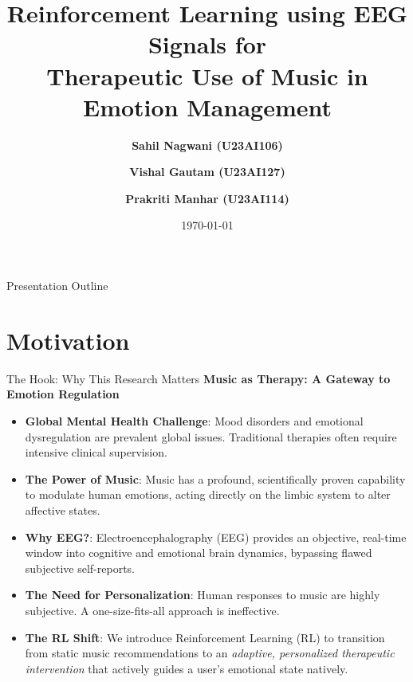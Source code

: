 \documentclass[10pt, aspectratio=169]{beamer}
\title[RL for Music Emotion Therapy]{Reinforcement Learning using EEG Signals for \\Therapeutic Use of Music in Emotion Management}
\author[Nagwani, Gautam, Manhar]{\textbf{Sahil Nagwani (U23AI106)} \and \textbf{Vishal Gautam (U23AI127)} \and \textbf{Prakriti Manhar (U23AI114)}}
\institute{Department of Artificial Intelligence}
\date{\today}
\begin{document}
\begin{frame}
    \titlepage
\end{frame}

\begin{frame}{Presentation Outline}
    \tableofcontents
\end{frame}

\section{Motivation}
\begin{frame}{The Hook: Why This Research Matters}
    \textbf{Music as Therapy: A Gateway to Emotion Regulation}
    \begin{itemize}
        \item \textbf{Global Mental Health Challenge}: Mood disorders and emotional dysregulation are prevalent global issues. Traditional therapies often require intensive clinical supervision.
        \item \textbf{The Power of Music}: Music has a profound, scientifically proven capability to modulate human emotions, acting directly on the limbic system to alter affective states.
        \item \textbf{Why EEG?}: Electroencephalography (EEG) provides an objective, real-time window into cognitive and emotional brain dynamics, bypassing flawed subjective self-reports.
        \item \textbf{The Need for Personalization}: Human responses to music are highly subjective. A one-size-fits-all approach is ineffective.
        \item \textbf{The RL Shift}: We introduce Reinforcement Learning (RL) to transition from static music recommendations to an \textit{adaptive, personalized therapeutic intervention} that actively guides a user's emotional state natively.
    \end{itemize}
\end{frame}

\end{document}
